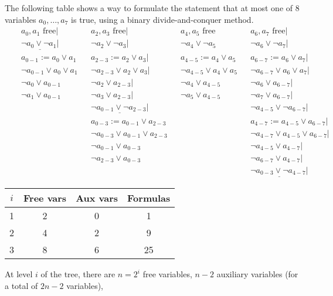 \documentclass{article}
\begin{document}
The following table shows a way to formulate the statement
that at most one of 8 variables $a_0, \ldots, a_7$ is true,
using a binary divide-and-conquer method.
\begin{align*}
  && a_0, a_1 \text{ free}|
  && a_2, a_3 \text{ free}|
  && a_4, a_5 \text{ free}
  && a_6, a_7 \text{ free}| \\
  && \underline{\lnot a_0 \lor \lnot a_1|}
  && \lnot a_2 \lor \lnot a_3|
  && \lnot a_4 \lor \lnot a_5
  && \lnot a_6 \lor \lnot a_7| \\
  && a_{0-1} := a_0 \lor a_1
  && a_{2-3} := a_2 \lor a_3|
  && a_{4-5} := a_4 \lor a_5
  && a_{6-7} := a_6 \lor a_7| \\
  && \lnot a_{0-1} \lor a_0 \lor a_1
  && \lnot a_{2-3} \lor a_2 \lor a_3|
  && \lnot a_{4-5} \lor a_4 \lor a_5
  && \lnot a_{6-7} \lor a_6 \lor a_7| \\
  && \lnot a_0 \lor a_{0-1}
  && \lnot a_2 \lor a_{2-3}|
  && \lnot a_4 \lor a_{4-5}
  && \lnot a_6 \lor a_{6-7}| \\
  && \lnot a_1 \lor a_{0-1}
  && \lnot a_3 \lor a_{2-3}|
  && \lnot a_5 \lor a_{4-5}
  && \lnot a_7 \lor a_{6-7}| \\
  && && \underline{\lnot a_{0-1} \lor \lnot  a_{2-3}|}
  && && \lnot a_{4-5} \lor \lnot  a_{6-7}| \\
  && && a_{0-3} := a_{0-1} \lor a_{2-3}
  && && a_{4-7} := a_{4-5} \lor a_{6-7}| \\
  && && \lnot a_{0-3} \lor a_{0-1} \lor a_{2-3}
  && && \lnot a_{4-7} \lor a_{4-5} \lor a_{6-7}| \\
  && && \lnot a_{0-1} \lor a_{0-3}
  && && \lnot a_{4-5} \lor a_{4-7}| \\
  && && \lnot a_{2-3} \lor a_{0-3}
  && && \lnot a_{6-7} \lor a_{4-7}| \\
  && && && && \underline{\lnot a_{0-3} \lor \lnot a_{4-7}|}
\end{align*}
\begin{center}
  \begin{tabular}{|c|c|c|c|}
    \hline
    $i$ & Free vars & Aux vars & Formulas \\ \hline
    1 & 2 & 0 & 1 \\ \hline
    2 & 4 & 2 & 9 \\ \hline
    3 & 8 & 6 & 25 \\ \hline
  \end{tabular}
\end{center}
At level $i$ of the tree,
there are $n=2^i$ free variables,
$n-2$ auxiliary variables
(for a total of $2n-2$ variables),
\end{document}

